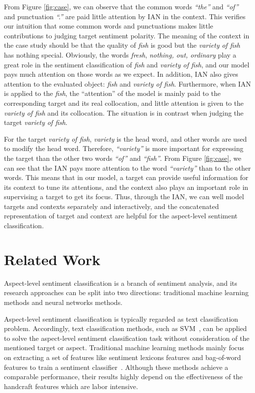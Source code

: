 \documentclass{article}
\begin{document}
From Figure \ref{fig:case}, we can observe that the common words \emph{``the''} and \emph{``of''} and punctuation \emph{``.''} are paid little attention by IAN in the context. This verifies our intuition that some common words and punctuations makes little contributions to judging target sentiment polarity. 
The meaning of the context in the case study should be that the quality of \emph{fish} is good but the \emph{variety of fish} has nothing special.
 Obviously, the words \emph{fresh}, \emph{nothing, out, ordinary} play a great role in the sentiment classification of \emph{fish} and \emph{variety of fish}, and our model pays much attention on those words as we expect. 
 In addition, IAN also gives attention to the evaluated object: \emph{fish} and \emph{variety of fish}. Furthermore, when IAN is applied to the \emph{fish}, the ``attention'' of the model is mainly paid to the corresponding target and its real collocation, and little attention is given to the \emph{variety of fish} and its collocation. The situation is in contrast when  judging the target \emph{variety of fish}.

For the target \emph{variety of fish}, \emph{variety} is the head word, and other words are  used to modify the head word. Therefore, \emph{``variety''} is more important for expressing the target than the other two words  \emph{``of''} and \emph{``fish''}. From  Figure \ref{fig:case}, we can see that the IAN pays more attention to the word \emph{``variety''} than to the other words.
This means that in our model, a target can provide useful information for its context to tune its attentions, and the context also plays an important role in supervising a target to get its focus.
Thus, through the IAN, we can well model  targets and contexts separately and interactively, and the concatenated representation of target and context are helpful for the aspect-level  sentiment classification.

\section{Related Work}
Aspect-level sentiment classification is a branch of sentiment analysis, and its research approaches can be split into two directions: traditional machine learning methods and neural networks methods. 

Aspect-level sentiment classification is typically regarded as text classification problem. Accordingly, text classification methods, such as SVM~\cite{pang2002thumbs}, can be applied to solve the aspect-level sentiment classification task without consideration of the mentioned target or aspect.
Traditional machine learning methods mainly focus on extracting a set of features like sentiment lexicons features and bag-of-word features to train a sentiment classifier~\cite{rao2009semi,kaji2007building,jiang2011target,perez2012learning,mohammad2013nrc}.
 Although these methods achieve a comparable performance, their results highly depend on the effectiveness of the handcraft features which are labor intensive. 
\end{document}
